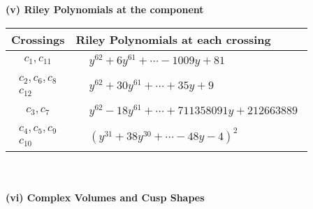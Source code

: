 \documentclass[1p]{elsarticle_modified}
\theoremstyle{definition}
\begin{document}
\newpage\renewcommand{\arraystretch}{1}
\flushleft \textbf{(v) Riley Polynomials at the component}\newline \\
\begin{tabular}{m{50pt}|m{274pt}}
Crossings & \hspace{64pt}Riley Polynomials at each crossing \\
\hline $$\begin{aligned}c_{1},c_{11}\end{aligned}$$&$\begin{aligned}
&y^{62}+6 y^{61}+\cdots-1009 y+81
\end{aligned}$\\
\hline $$\begin{aligned}c_{2},c_{6},c_{8}\\c_{12}\end{aligned}$$&$\begin{aligned}
&y^{62}+30 y^{61}+\cdots+35 y+9
\end{aligned}$\\
\hline $$\begin{aligned}c_{3},c_{7}\end{aligned}$$&$\begin{aligned}
&y^{62}-18 y^{61}+\cdots+711358091 y+212663889
\end{aligned}$\\
\hline $$\begin{aligned}c_{4},c_{5},c_{9}\\c_{10}\end{aligned}$$&$\begin{aligned}
&(y^{31}+38 y^{30}+\cdots-48 y-4)^{2}
\end{aligned}$\\
\hline
\end{tabular}\\~\\
\newpage\flushleft \textbf{(vi) Complex Volumes and Cusp Shapes}
\end{document}
